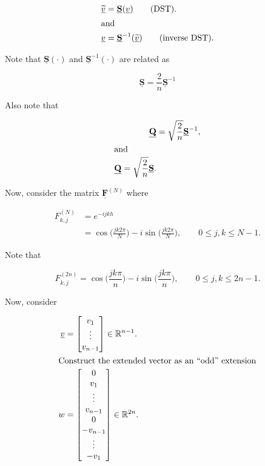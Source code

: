 \documentclass[11pt]{article}
\begin{document}
\begin{align*}
  \underline{\widetilde{v}} &= \underline{\mathbf{S}} (\underline{v}) \qquad (\text{DST}). \\
  \intertext{and}
  \underline{v} &= \underline{\mathbf{S}}^{-1} (\underline{\widetilde{v}}) \qquad (\text{inverse DST}).
\end{align*}

Note that $\underline{\mathbf{S}}(\cdot)$ and $\underline{\mathbf{S}}^{-1}(\cdot)$ are related as 

\begin{equation*}
  \boxed{
    \underline{\mathbf{S}} = \frac{2}{n} \underline{\mathbf{S}}^{-1}
  }
\end{equation*}

Also note that

\begin{align*}
  \underline{\mathbf{Q}} &= \sqrt{\frac{2}{n}} \underline{\mathbf{S}}^{-1}, \\ 
  \intertext{and}
  \underline{\mathbf{Q}} = \sqrt{\frac{2}{n}} \underline{\mathbf{S}}.
\end{align*}

Now, consider the matrix $\underline{\mathbf{F}}^{(N)}$ where

\begin{equation*}
  \begin{split}
    F_{k,j}^{(N)} &= e^{-ijkh} \\
    &= \cos \biggl( \frac{j k 2 \pi}{N} \biggr) - i \sin \biggl( \frac{j k 2 \pi}{N} \biggr), \qquad 0 \leq j,k \leq N-1.
  \end{split}
\end{equation*}

Note that

\begin{equation*}
  F_{k,j}^{(2 n)} = \cos \biggl( \frac{j k \pi}{n} \biggr) - i \sin \biggl( \frac{j k \pi}{n} \biggr), \qquad 0 \leq j,k \leq 2n-1.
\end{equation*}

Now, consider

\begin{align*}
  \underline{v} &= 
  \begin{bmatrix}
    v_1 \\
    \vdots \\
    v_{n-1}
  \end{bmatrix}
  \in \mathbb{R}^{n-1}. \\
  \intertext{Construct the extended vector as an ``odd'' extension}
  w &=
  \begin{bmatrix}
    0 \\ 
    v_1 \\
    \vdots \\
    v_{n-1} \\
    0 \\
    -v_{n-1} \\
    \vdots \\
    -v_1
  \end{bmatrix}
  \in \mathbb{R}^{2n}.
\end{align*}
\end{document}
